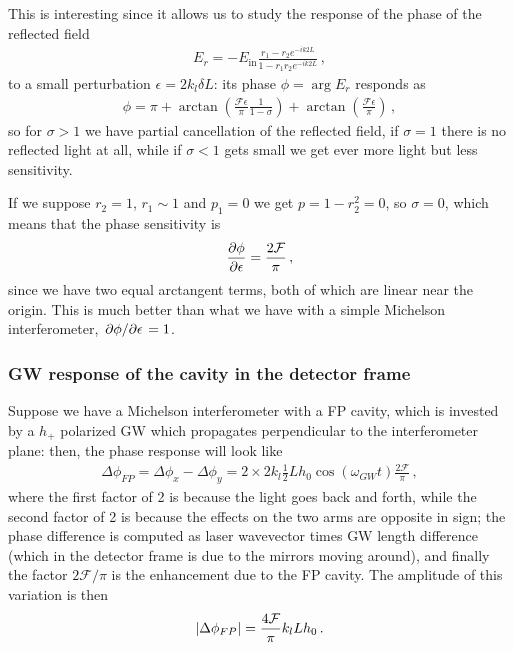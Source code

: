 \documentclass[main.tex]{subfiles}
\begin{document}
This is interesting since it allows us to study the response of the phase of the reflected field 
%
\begin{align}
E_r = - E _{\text{in}} \frac{r_1 - r_2 e^{-ik2L}}{1 - r_1 r_2 e^{-ik2L}}
\,,
\end{align}
%
to a small perturbation \(\epsilon = 2 k_l \delta L\): its phase \(\phi = \arg E_r\) responds as
%
\begin{align}
\phi  = \pi + \arctan (\frac{\mathcal{F} \epsilon }{\pi } \frac{1}{1 - \sigma })
+ \arctan (\frac{\mathcal{F}\epsilon }{\pi })
\,,
\end{align}
%
so for \(\sigma > 1\) we have partial cancellation of the reflected field, if \(\sigma = 1\)  there is no reflected light at all, while if \(\sigma < 1 \) gets small we get ever more light but less sensitivity. 


If we suppose \(r_2 = 1 \), \(r_1 \sim 1\) and \(p_1 = 0 \) we get \(p = 1 - r_2^2 = 0\), so \(\sigma = 0\), which means that the phase sensitivity is 
%
\begin{align}
\pdv{\phi }{\epsilon } = \frac{2 \mathcal{F}}{\pi  }
\,,
\end{align}
%
since we have two equal arctangent terms, both of which are linear near the origin.
This is much better than what we have with a simple Michelson interferometer, \(\pdv*{\phi }{\epsilon } = 1\). 

\subsubsection{GW response of the cavity in the detector frame}

Suppose we have a Michelson interferometer with a FP cavity, which is invested by a \(h_+\) polarized GW which propagates perpendicular to the interferometer plane: then, the phase response will look like 
%
\begin{align}
\Delta \phi_{FP} = \Delta \phi_{x} - \Delta \phi_{y} = 
2 \times 2 k_l \frac{1}{2} L h_0 \cos(\omega_{GW} t) \frac{2 \mathcal{F}}{\pi }
\,,
\end{align}
%
where the first factor of 2 is because the light goes back and forth, while the second factor of 2 is because the effects on the two arms are opposite in sign; the phase difference is computed as laser wavevector times GW length difference (which in the detector frame is due to the mirrors moving around), and finally the factor \(2 \mathcal{F} / \pi \) is the enhancement due to the FP cavity. The amplitude of this variation is then 
%
\begin{align}
\abs{\Delta \phi_{FP}} = \frac{4 \mathcal{F}}{\pi } k_l L h_0 
\,.
\end{align}
\end{document}
